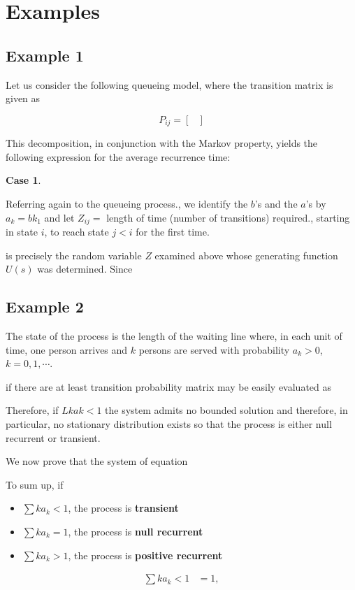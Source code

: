 \documentclass[12pt]{article}
\theoremstyle{nonumberbreak}
\begin{document}


\section{Examples}

\subsection{Example 1}

Let us consider the following queueing model, where the transition matrix is given as

$$
P_{ij} = \begin{bmatrix}
\end{bmatrix}
$$

This decomposition, in conjunc­tion with the Markov property, yields the following expression for the average recurrence time:


\textbf{Case 1}. 


Referring again to the queueing process., we identify the $b$'s and the $a$'s by $a_k = bk _ 1$ and let $Z_{ij} =$ length of time (number of transitions) re­quired., starting in state $i$, to reach state $j < i$ for the first time. 

is precisely the random variable $Z$ examined above whose generating function $U(s)$ was determined. Since


\subsection{Example 2}

The state of the process is the length of the waiting line where, in each unit of time, one person arrives and $k$ persons are served with probability $a_k > 0$, $k=0,1,\cdots$. 


if there are at least transition probability matrix may be easily evaluated as



Therefore, if $L kak < 1$ the system admits no bounded solution and therefore, in particular, no stationary distribution exists so that the process is either null recurrent or transient. 

We now prove that the system of equation


To sum up, if

\begin{itemize}
	\item $\sum k a_k < 1$, the process is \textbf{transient}
	\item $\sum k a_k = 1$, the process is \textbf{null recurrent}
	\item $\sum k a_k > 1$, the process is \textbf{positive recurrent}
\end{itemize}

$$
\begin{aligned}
\sum k a_k <1 &= 1, \\[8pt]
\end{aligned}
$$
\end{document}

